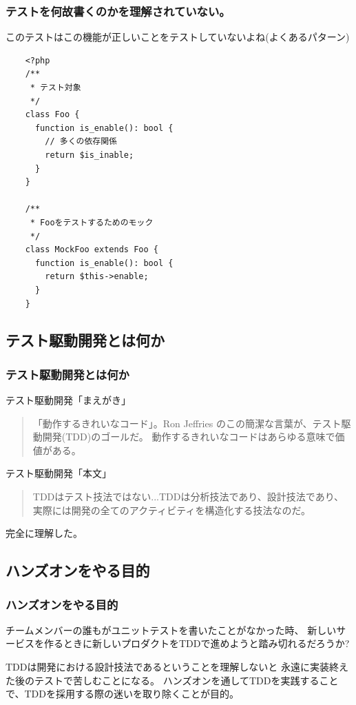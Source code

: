 \documentclass[aspectratio=169]{beamer}
\begin{document}
\begin{frame}[fragile]\frametitle{テストを何故書くのかを理解されていない。}
  このテストはこの機能が正しいことをテストしていないよね(よくあるパターン)
  \begin{verbatim}
    <?php
    /**
     * テスト対象
     */
    class Foo {
      function is_enable(): bool {
        // 多くの依存関係
        return $is_inable;
      }
    }

    /**
     * Fooをテストするためのモック
     */
    class MockFoo extends Foo {
      function is_enable(): bool {
        return $this->enable;
      }
    }
  \end{verbatim}
\end{frame}

\subsection{テスト駆動開発とは何か}
\begin{frame}\frametitle{テスト駆動開発とは何か}
  {\small \color[gray]{0.5} テスト駆動開発「まえがき」}
  \begin{quotation}
    「動作するきれいなコード」。Ron Jeffries のこの簡潔な言葉が、テスト駆動開発(TDD)のゴールだ。
    動作するきれいなコードはあらゆる意味で価値がある。
  \end{quotation}

  {\small \color[gray]{0.5} テスト駆動開発「本文」}
  \begin{quotation}
    TDDはテスト技法ではない...TDDは分析技法であり、設計技法であり、実際には開発の全てのアクティビティを構造化する技法なのだ。
  \end{quotation}

  \vspace{1\baselineskip}
  完全に理解した。
\end{frame}

\subsection{ハンズオンをやる目的}
\begin{frame}\frametitle{ハンズオンをやる目的}
  チームメンバーの誰もがユニットテストを書いたことがなかった時、
  新しいサービスを作るときに新しいプロダクトをTDDで進めようと踏み切れるだろうか?

  \vspace{1\baselineskip}
  TDDは開発における設計技法であるということを理解しないと
  永遠に実装終えた後のテストで苦しむことになる。
  ハンズオンを通してTDDを実践することで、TDDを採用する際の迷いを取り除くことが目的。
\end{frame}
\end{document}
